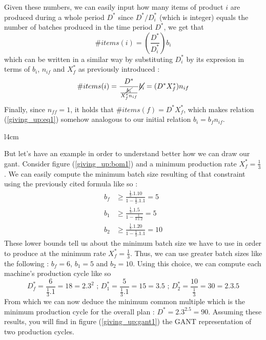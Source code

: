 Given these numbers, we can easily input how many items of product $i$ are produced during a whole period $D^*$ since $D^*/D_i^*$ (which is integer) equals the number of batches produced in the time period $D^*$, we get that \[ \#items(i) = \left( \frac{D^*}{D_i^*} \right)b_i \] which can be written in a similar way by substituting $D_i^*$ by its expresion in terms of $b_i$, $n_{if}$ and $X_f^*$ as previously introduced : \begin{equation} \#items(i) = \dfrac{D^*}{ \frac{\cancel{b_i}}{X_f^*n_{if}} }\cancel{b_i} = (D^*X_f^*)n_{if} \label{giving_up:eq1} \end{equation} Finally, since $n_{ff} = 1$, it holds that $\#items(f) = D^*X_f^*$, which makes relation (\ref{giving_up:eq1}) somehow analogous to our initial relation $b_i = b_fn_{if}$.

\begin{wrapfigure}[14]{l}{4cm}
    \centering
    \caption{\label{giving_up:bom1}Example}
\end{wrapfigure}

But let's have an example in order to understand better how we can draw our gant. Consider figure (\ref{giving_up:bom1}) and a minimum production rate $X_f^* = \frac{1}{3}$. We can easily compute the minimum batch size resulting of that constraint using the previously cited formula like so :
\[
    \begin{split}
        b_f &\ge \frac{\frac{1}{3}.1.10}{1-\frac{1}{3}.1.1} = 5\\
        b_1 &\ge \frac{\frac{1}{3}.1.5}{1 -\frac{1}{3.1.2}} = 5\\
        b_2 &\ge \frac{\frac{1}{3}.1.20}{1-\frac{1}{3}.1.1} = 10
    \end{split}
\]
These lower bounds tell us about the minimum batch size we have to use in order to produce at the minimum rate $X_f^*=\frac{1}{3}$. Thus, we can use greater batch sizes like the following : $b_f = 6$, $b_1 = 5$ and $b_2 = 10$. Using this choice, we can compute each machine's production cycle like so 
\[
    D_f^* = \frac{6}{\frac{1}{3}.1} = 18 = 2.3^2 \textrm{ ; }
    D_1^* = \frac{5}{\frac{1}{3}.1} = 15 = 3.5 \textrm{ ; }
    D_2^* = \frac{10}{\frac{1}{3}} = 30 = 2.3.5
\]
From which we can now deduce the minimum common multiple which is the minimum production cycle for the overall plan : $D^* = 2.3^2.5 = 90$. Assuming these results, you will find in figure (\ref{giving_up:gant1}) the GANT representation of two production cycles.

